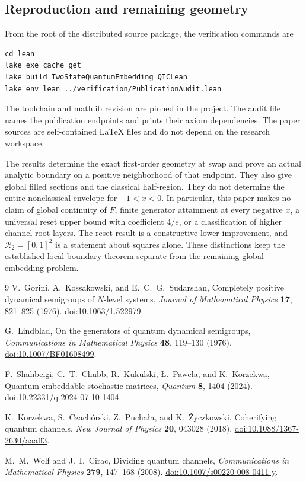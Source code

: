 \documentclass[11pt]{article}
\theoremstyle{definition}
\theoremstyle{remark}
\begin{document}
\subsection{Reproduction and remaining geometry}
From the root of the distributed source package, the verification commands are
\begin{verbatim}
cd lean
lake exe cache get
lake build TwoStateQuantumEmbedding QICLean
lake env lean ../verification/PublicationAudit.lean
\end{verbatim}
The toolchain and mathlib revision are pinned in the project. The audit file names the publication endpoints and prints their axiom dependencies. The paper sources are self-contained LaTeX files and do not depend on the research workspace.

The results determine the exact first-order geometry at swap and prove an actual analytic boundary on a positive neighborhood of that endpoint. They also give global filled sections and the classical half-region. They do not determine the entire nonclassical envelope for \(-1<x<0\). In particular, this paper makes no claim of global continuity of \(F\), finite generator attainment at every negative \(x\), a universal reset upper bound with coefficient \(4/e\), or a classification of higher channel-root layers. The reset result is a constructive lower improvement, and \(\mathcal R_2=[0,1]^2\) is a statement about squares alone. These distinctions keep the established local boundary theorem separate from the remaining global embedding problem.

\begin{thebibliography}{9}
V.~Gorini, A.~Kossakowski, and E.~C.~G.~Sudarshan,
Completely positive dynamical semigroups of \(N\)-level systems,
\emph{Journal of Mathematical Physics} \textbf{17}, 821--825 (1976).
\href{https://doi.org/10.1063/1.522979}{doi:10.1063/1.522979}.

G.~Lindblad,
On the generators of quantum dynamical semigroups,
\emph{Communications in Mathematical Physics} \textbf{48}, 119--130 (1976).
\href{https://doi.org/10.1007/BF01608499}{doi:10.1007/BF01608499}.

F.~Shahbeigi, C.~T.~Chubb, R.~Kukulski, {\L}.~Pawela, and K.~Korzekwa,
Quantum-embeddable stochastic matrices,
\emph{Quantum} \textbf{8}, 1404 (2024).
\href{https://doi.org/10.22331/q-2024-07-10-1404}{doi:10.22331/q-2024-07-10-1404}.

K.~Korzekwa, S.~Czach\'orski, Z.~Pucha\l a, and K.~\.{Z}yczkowski,
Coherifying quantum channels,
\emph{New Journal of Physics} \textbf{20}, 043028 (2018).
\href{https://doi.org/10.1088/1367-2630/aaaff3}{doi:10.1088/1367-2630/aaaff3}.

M.~M.~Wolf and J.~I.~Cirac,
Dividing quantum channels,
\emph{Communications in Mathematical Physics} \textbf{279}, 147--168 (2008).
\href{https://doi.org/10.1007/s00220-008-0411-y}{doi:10.1007/s00220-008-0411-y}.
\end{thebibliography}
\end{document}
